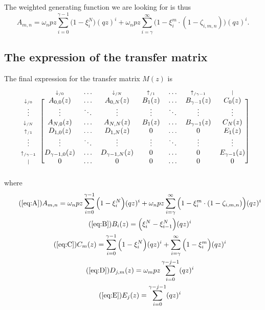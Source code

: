 \documentclass{article}
\newcommand{\dn}[1]{\scriptstyle{\downarrow_{/#1}}}
\newcommand{\up}[1]{\scriptstyle{\uparrow_{/#1}}}
\newcommand{\nd}{\scriptstyle{|}}
\begin{document}
The weighted generating function we are looking for is thus
\begin{equation}
\label{eq:A}
A_{m,n} =
\omega_n pz \sum_{i=0}^{\gamma-1} \Big(1 - \xi_i^N \Big) (qz)^i + \omega_n
pz \sum_{i=\gamma}^\infty \Big(1 - \xi_i^m \cdot
(1- \zeta_{i,m,n}) \Big) (qz)^i.
\end{equation}

\subsection{The expression of the transfer matrix}

The final expression for the transfer matrix $M(z)$ is
\begin{equation*}
\begin{blockarray}{cccccccc}
   & \dn{0} & \ldots & \dn{N} & \up{1} & \ldots & \up{\gamma-1} & \nd \\
\begin{block}{c[ccccccc]}
\dn{0} & A_{0,0}(z) & \ldots & A_{0,N}(z) & B_1(z) & \ldots &
    B_{\gamma-1}(z) & C_0(z) \\
\vdots & \vdots & \ddots & \vdots & \vdots & \ddots &
    \vdots & \vdots \\
\dn{N} & A_{N,0}(z) & \ldots & A_{N,N}(z) & B_1(z) & \ldots &
    B_{\gamma-1}(z) & C_N(z) \\
\up{1} & D_{1,0}(z) & \ldots & D_{1,N}(z) & 0 & \ldots & 0 & E_1(z) \\
\vdots & \vdots & \ddots & \vdots & \vdots & \ddots &
    \vdots & \vdots \\
\up{\gamma-1} & D_{\gamma-1,0}(z) & \ldots & D_{\gamma-1,N}(z) & 0 &
  \ldots & 0 & E_{\gamma-1}(z) \\
\nd & 0 & \ldots & 0 & 0 & \ldots & 0 & 0 \\
\end{block}
\end{blockarray}
\end{equation*}
where
\begin{gather}
\tag{\ref{eq:A}}
A_{m,n} =
\omega_n pz \sum_{i=0}^{\gamma-1} \Big(1 - \xi_i^N \Big) (qz)^i + \omega_n
pz \sum_{i=\gamma}^\infty \Big(1 - \xi_i^m \cdot
(1- \zeta_{i,m,n}) \Big) (qz)^i \\
\tag{\ref{eq:B}}
B_i(z) = \Big( \xi_i^N-\xi_{i-1}^N \Big) (qz)^i \\
\tag{\ref{eq:C}}
C_m(z) =
\sum_{i=0}^{\gamma-1} \Big(1 - \xi_i^N \Big) (qz)^i +
  \sum_{i=\gamma}^\infty \Big(1 - \xi_i^m \Big) (qz)^i \\
\tag{\ref{eq:D}}
D_{j,m}(z) = \omega_m pz \sum_{i=0}^{\gamma-j-1} (qz)^i \\
\tag{\ref{eq:E}}
E_j(z) = \sum_{i=0}^{\gamma-j-1} (qz)^i
\end{gather}
\end{document}
